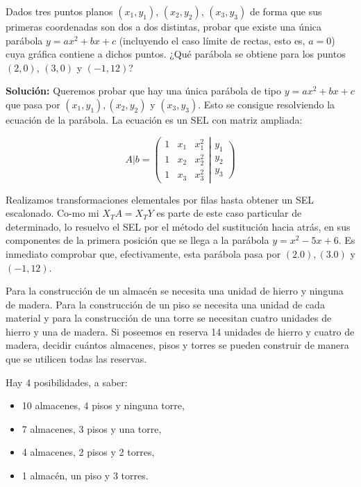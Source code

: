 \begin{ejercicio}Dados tres puntos planos $(x_1, y_1)$, $(x_2, y_2)$, $(x_3, y_3)$ de forma que sus primeras coordenadas son dos a dos distintas, probar que existe una única parábola $y = ax^2 + bx + c$ (incluyendo el caso límite de rectas, esto es, $a = 0$) cuya gráfica contiene a dichos puntos. ¿Qué parábola se obtiene para los puntos $(2, 0)$, $(3, 0)$ y $(-1, 12)$?


	\textbf{Solución:} Queremos probar que hay una única parábola de tipo \( y = ax^2 + bx + c \) que pasa por \( (x_1, y_1), (x_2, y_2) \) y \( (x_3, y_3) \). Esto se consigue resolviendo la ecuación de la parábola. La ecuación es un SEL con matriz ampliada:

	\[
		A|b =
		\left( \begin{array}{ccc}
				1 & x_1 & x_{1}^{2} \\
				1 & x_2 & x_{2}^{2} \\
				1 & x_3 & x_{3}^{2}
			\end{array} \right|
		\left. \begin{array}{c}
				y_{1} \\
				y_{2} \\
				y_{3}
			\end{array} \right)
	\]

	Realizamos transformaciones elementales por filas hasta obtener un SEL escalonado. Co-mo mi \( X_T A = X_T Y\) es parte de este caso particular de determinado, lo resuelvo el SEL por el método del sustitución hacia atrás, en sus componentes de la primera posición que se llega a la parábola \( y = x^2 - 5x + 6 \). Es inmediato comprobar que, efectivamente, esta parábola pasa por \( (2.0), (3.0) \) y \( (-1,12) \).


\end{ejercicio}
\begin{ejercicio}Para la construcción de un almacén se necesita una unidad de hierro y ninguna de madera. Para la construcción de un piso se necesita una unidad de cada material y para la construcción de una torre se necesitan cuatro unidades de hierro y una de madera. Si poseemos en reserva 14 unidades de hierro y cuatro de madera, decidir cuántos almacenes, pisos y torres se pueden construir de manera que se utilicen todas las reservas.

		{Hay 4 posibilidades, a saber:

			\begin{itemize}
				\item 10 almacenes, 4 pisos y ninguna torre,
				\item 7 almacenes, 3 pisos y una torre,
				\item 4 almacenes, 2 pisos y 2 torres,
				\item 1 almacén, un piso y 3 torres.
			\end{itemize}}

\end{ejercicio}
